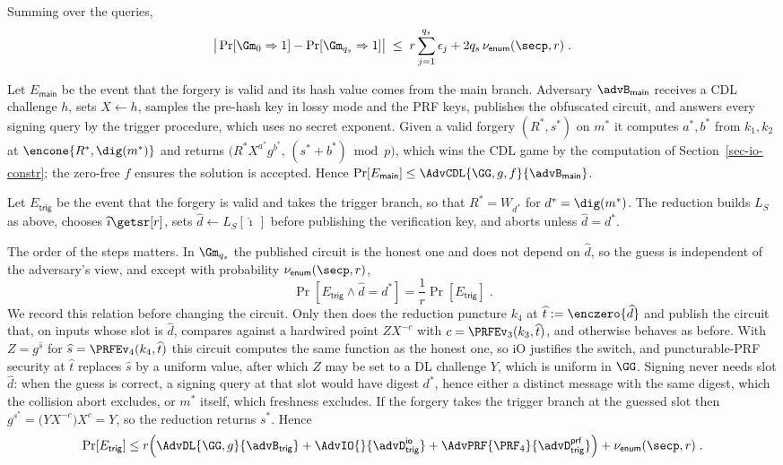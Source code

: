 Summing over the queries,
$$
\big|\Pr[\Gm_0 \Rightarrow 1] - \Pr[\Gm_{q_s} \Rightarrow 1]\big|
\;\le\;
r\sum_{j=1}^{q_s}\epsilon_j + 2q_s\,\nu_{\mathsf{enum}}(\secp,r) \;.
$$

 Let $E_{\mathsf{main}}$ be the event that the forgery is valid and its hash value comes from the main branch. Adversary $\advB_{\mathsf{main}}$ receives a CDL challenge $h$, sets $X \gets h$, samples the pre-hash key in lossy mode and the PRF keys, publishes the obfuscated circuit, and answers every signing query by the trigger procedure, which uses no secret exponent. Given a valid forgery $(R^*,s^*)$ on $m^*$ it computes $a^*,b^*$ from $k_1,k_2$ at $\encone{R^*,\dig(m^*)}$ and returns $\big(R^*X^{a^*}g^{b^*},\,(s^*+b^*)\bmod p\big)$, which wins the CDL game by the computation of Section~\ref{sec-io-constr}; the zero-free $f$ ensures the solution is accepted. Hence $\Pr[E_{\mathsf{main}}] \le \AdvCDL{\GG,g,f}{\advB_{\mathsf{main}}}$.

 Let $E_{\mathsf{trig}}$ be the event that the forgery is valid and takes the trigger branch, so that $R^* = W_{d^*}$ for $d^* = \dig(m^*)$. The reduction builds $L_S$ as above, chooses $\widehat\imath \getsr [r]$, sets $\widehat d \gets L_S[\widehat\imath\,]$ before publishing the verification key, and aborts unless $\widehat d = d^*$.

The order of the steps matters. In $\Gm_{q_s}$ the published circuit is the honest one and does not depend on $\widehat d$, so the guess is independent of the adversary's view, and except with probability $\nu_{\mathsf{enum}}(\secp,r)$,
$$
\Pr[E_{\mathsf{trig}} \land \widehat d = d^*] = \frac{1}{r}\Pr[E_{\mathsf{trig}}] \;.
$$
We record this relation before changing the circuit. Only then does the reduction puncture $k_4$ at $\widehat t := \enczero{\widehat d}$ and publish the circuit that, on inputs whose slot is $\widehat d$, compares against a hardwired point $Z X^{-c}$ with $c = \PRFEv_3(k_3,\widehat t)$, and otherwise behaves as before. With $Z = g^{\widehat s}$ for $\widehat s = \PRFEv_4(k_4,\widehat t)$ this circuit computes the same function as the honest one, so iO justifies the switch, and puncturable-PRF security at $\widehat t$ replaces $\widehat s$ by a uniform value, after which $Z$ may be set to a DL challenge $Y$, which is uniform in $\GG$. Signing never needs slot $\widehat d$: when the guess is correct, a signing query at that slot would have digest $d^*$, hence either a distinct message with the same digest, which the collision abort excludes, or $m^*$ itself, which freshness excludes. If the forgery takes the trigger branch at the guessed slot then $g^{s^*} = \big(YX^{-c}\big)X^{c} = Y$, so the reduction returns $s^*$. Hence
$$
\Pr[E_{\mathsf{trig}}]
\le
r\Big(
\AdvDL{\GG,g}{\advB_{\mathsf{trig}}}
+\AdvIO{}{\advD^{\mathsf{io}}_{\mathsf{trig}}}
+\AdvPRF{\PRF_4}{\advD^{\mathsf{prf}}_{\mathsf{trig}}}
\Big)
+\nu_{\mathsf{enum}}(\secp,r) \;.
$$

